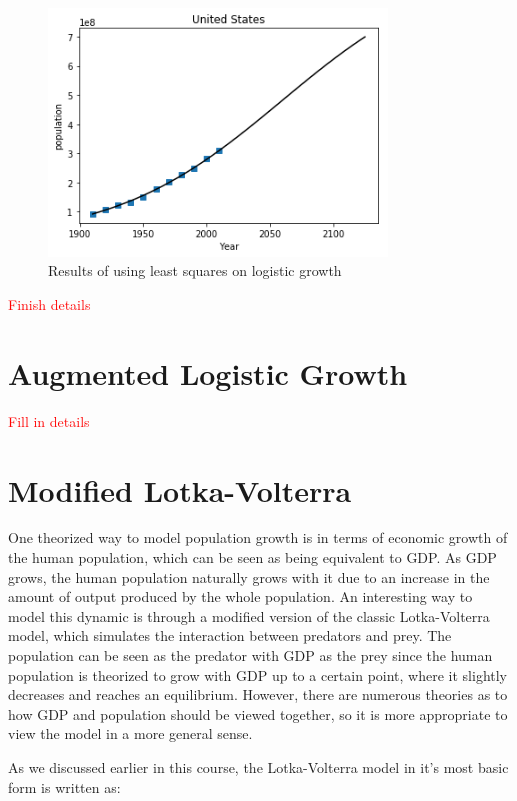 \documentclass{article}
\newcommand{\todo}[1]{{\Large\textcolor{red}{#1}}}
\begin{document}
\begin{figure}[ht!]
\centering
\includegraphics[width=90mm]{images/lr-graph.png}
\caption{Results of using least squares on logistic growth \label{overflow}}
\end{figure}

\todo{Finish details}

\section{Augmented Logistic Growth}

\todo{Fill in details}

\section{Modified Lotka-Volterra}

One theorized way to model population growth is in terms of economic growth of the human population, which can be seen as being equivalent to GDP. As GDP grows, the human population naturally grows with it due to an increase in the amount of output produced by the whole population. An interesting way to model this dynamic is through a modified version of the classic Lotka-Volterra model, which simulates the interaction between predators and prey. The population can be seen as the predator with GDP as the prey since the human population is theorized to grow with GDP up to a certain point, where it slightly decreases and reaches an equilibrium. However, there are numerous theories as to how GDP and population should be viewed together, so it is more appropriate to view the model in a more general sense. 

As we discussed earlier in this course, the Lotka-Volterra model in it's most basic form is written as:
\end{document}
